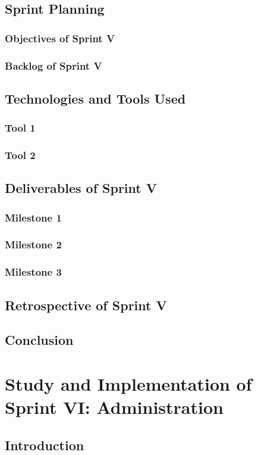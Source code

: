 \documentclass[a4paper,12pt]{report}
\begin{document}
\section{Sprint Planning}
\subsection{Objectives of Sprint V}
\subsection{Backlog of Sprint V}
\section{Technologies and Tools Used}
\subsection{Tool 1}
\subsection{Tool 2}
\section{Deliverables of Sprint V}
\subsection{Milestone 1}
\subsection{Milestone 2}
\subsection{Milestone 3}
\section{Retrospective of Sprint V}
\section{Conclusion}

\chapter[Sprint VI]{Study and Implementation of Sprint VI: Administration}

\minitoc
\section{Introduction}
\end{document}
